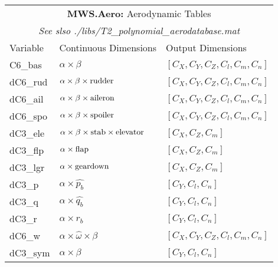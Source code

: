 \documentclass[12pt]{article}
\begin{document}
\begin{center}
\vfill
\begin{tabular}{|l|l|l|}
\multicolumn{3}{c}{{\bf MWS.Aero:} Aerodynamic Tables}\\
\multicolumn{3}{c}{\em See slso ./libs/T2\_polynomial\_aerodatabase.mat}\\
\hline
Variable & Continuous Dimensions & Output Dimensions\\
\hline
C6\_bas  & $\alpha \times \beta$     & $\left[C_X,C_Y,C_Z,C_l,C_m,C_n\right]$\\
dC6\_rud & $\alpha \times \beta \times {\rm rudder}  $ & $\left[C_X,C_Y,C_Z,C_l,C_m,C_n \right]$ \\
dC6\_ail & $\alpha \times \beta \times {\rm aileron} $ & $\left[C_X,C_Y,C_Z,C_l,C_m,C_n \right]$ \\
dC6\_spo & $\alpha \times \beta \times {\rm spoiler} $ & $\left[C_X,C_Y,C_Z,C_l,C_m,C_n \right]$ \\
dC3\_ele & $\alpha \times \beta \times {\rm stab}  \times {\rm elevator} $ & $\left[C_X,C_Z,C_m\right]  $ \\
dC3\_flp & $\alpha \times {\rm flap} $ & $\left[C_X,C_Z,C_m \right] $ \\
dC3\_lgr & $\alpha \times {\rm geardown}$   & $\left[C_X,C_Z,C_m \right]$ \\
dC3\_p   & $\alpha \times \hat{p_b}$ & $\left[ C_Y,C_l,C_n \right]$ \\
dC3\_q   & $\alpha \times \hat{q_b}$ & $\left[ C_Y,C_l,C_n \right]$ \\
dC3\_r   & $\alpha \times \hat{r_b}$ & $\left[ C_Y,C_l,C_n \right]$ \\
dC6\_w   & $\alpha \times \hat{\omega} \times  \beta $ & $\left[C_X,C_Y,C_Z,C_l,C_m,C_n\right]$\\
dC3\_sym & $\alpha \times \beta $ & $ \left[ C_Y,C_l,C_n\right]$\\
\hline
\end{tabular}
\vfill

\end{center}
\end{document}
